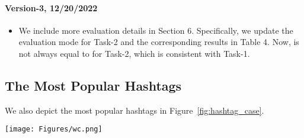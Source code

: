 \documentclass[11pt]{article}
\newcommand{\DataName}{MMDialog}
\begin{document}
\paragraph{Version-3, 12/20/2022}
\par

\begin{itemize}
\setlength{\itemsep}{0pt}
    \item We include more evaluation details in Section 6. Specifically, we update the evaluation mode for Task-2 and the corresponding results in Table 4. Now,  is not always equal to  for Task-2, which is consistent with Task-1.

\end{itemize}


\subsection{The Most Popular Hashtags}\label{appendix:dataset}

We also depict the most popular hashtags in Figure~\ref{fig:hashtag_case}.

\begin{figure*}[!tb]
\centering  \texttt{[image: Figures/wc.png]}
     \caption{200 most popular hashtags in \DataName~weighted by their frequencies.}
     \label{fig:hashtag_case}
\end{figure*}










 
\end{document}
